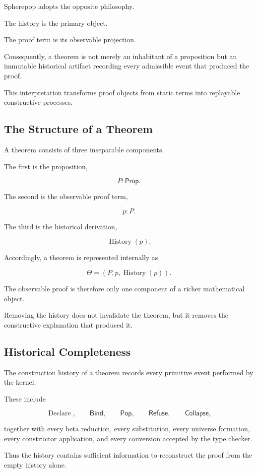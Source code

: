 \documentclass[12pt,oneside]{article}
\theoremstyle{definition}
\theoremstyle{remark}
\newcommand{\Prop}{\mathsf{Prop}}
\newcommand{\Pop}{\mathsf{Pop}}
\newcommand{\Refuse}{\mathsf{Refuse}}
\newcommand{\Bind}{\mathsf{Bind}}
\newcommand{\Collapse}{\mathsf{Collapse}}
\DeclareMathOperator{\History}{History}
\begin{document}
Spherepop adopts the opposite philosophy.

The history is the primary object.

The proof term is its observable projection.

Consequently, a theorem is not merely an inhabitant of a proposition but an
immutable historical artifact recording every admissible event that produced the
proof.

This interpretation transforms proof objects from static terms into replayable
constructive processes.

\subsection{The Structure of a Theorem}

A theorem consists of three inseparable components.

The first is the proposition,

\[
P:\Prop.
\]

The second is the observable proof term,

\[
p:P.
\]

The third is the historical derivation,

\[
\History(p).
\]

Accordingly, a theorem is represented internally as

\[
\Theta
=
(P,p,\History(p)).
\]

The observable proof is therefore only one component of a richer mathematical
object.

Removing the history does not invalidate the theorem, but it removes the
constructive explanation that produced it.

\subsection{Historical Completeness}

The construction history of a theorem records every primitive event performed by
the kernel.

These include

\[
\operatorname{Declare},
\qquad
\Bind,
\qquad
\Pop,
\qquad
\Refuse,
\qquad
\Collapse,
\]

together with every beta reduction, every substitution, every universe
formation, every constructor application, and every conversion accepted by the
type checker.

Thus the history contains sufficient information to reconstruct the proof from
the empty history alone.
\end{document}

